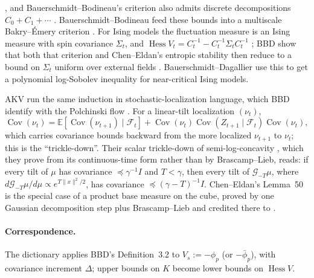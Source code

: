 \documentclass[11pt]{article}
\newcommand{\E}{\mathbb{E}}
\DeclareMathOperator{\Cov}{Cov}
\newcommand{\norm}[1]{\lVert #1\rVert}
\newcommand{\sloc}[2]{\cite[#2]{#1}}
\begin{document}
\sloc{BauerschmidtBodineauDagallier2023-PolchinskiIntroduction}{Lemma~3.11, (3.56)},
and Bauerschmidt--Bodineau's criterion also admits discrete decompositions
$C_0+C_1+\cdots$
\sloc{BauerschmidtBodineau2019-SineGordonMultiscaleBakryEmery}{Thm.~2.6}.
Bauerschmidt--Bodineau feed these bounds into a multiscale Bakry--\'Emery
criterion \sloc{BauerschmidtBodineau2019-SineGordonMultiscaleBakryEmery}{Thms.~1.2 and~2.5}.
For Ising models the fluctuation measure is an Ising measure with
spin covariance $\Sigma_t$, and
$\operatorname{Hess}V_t=C_t^{-1}-C_t^{-1}\Sigma_tC_t^{-1}$
\sloc{BauerschmidtDagallier2022-NearCriticalIsingLSI}{(1.23)}; BBD show that
both that criterion and Chen--Eldan's entropic stability then reduce to a
bound on $\Sigma_t$ uniform over external fields
\sloc{BauerschmidtBodineauDagallier2023-PolchinskiIntroduction}{Thm.~6.12, Ex.~6.15}.
Bauerschmidt--Dagallier use this to get a polynomial log-Sobolev inequality
for near-critical Ising models.

AKV run the same induction in stochastic-localization language, which BBD
identify with the Polchinski flow
\sloc{BauerschmidtBodineauDagallier2023-PolchinskiIntroduction}{\S4.5}. For a
linear-tilt localization $(\nu_t)$,
\sloc{AnariKoehlerVuong2024-TrickleDownLocalizationSchemes}{eq.~(8), p.~32}
\[
 \Cov(\nu_t)=\E[\Cov(\nu_{t+1})\mid\mathcal F_t]
 +\Cov(\nu_t)\Cov(Z_{t+1}\mid\mathcal F_t)\Cov(\nu_t),
\]
which carries covariance bounds backward from the more localized
$\nu_{t+1}$ to $\nu_t$; this is the ``trickle-down''. Their scalar
trickle-down of semi-log-concavity
\sloc{AnariKoehlerVuong2024-TrickleDownLocalizationSchemes}{Thm.~102, p.~76},
which they prove from its continuous-time form
\sloc{AnariKoehlerVuong2024-TrickleDownLocalizationSchemes}{(10)} rather than
by Brascamp--Lieb,
reads: if every tilt of $\mu$ has covariance $\preceq\gamma^{-1}I$ and
$T<\gamma$, then every tilt of $\mathcal G_{-T}\mu$, where
$d\mathcal G_{-T}\mu/d\mu\propto e^{T\norm x^2/2}$, has covariance
$\preceq(\gamma-T)^{-1}I$. Chen--Eldan's Lemma~50
\cite{ChenEldan2022-LocalizationSchemes} is the special case of a product
base measure on the cube, proved by one Gaussian decomposition step plus
Brascamp--Lieb and credited there to
\cite{BauerschmidtBodineau2017-SimpleProofLSIHighTemp}.

\paragraph{Correspondence.}
The dictionary applies BBD's Definition~3.2 to $V_s:=-\phi_p$ (or
$-\bar\phi_p$), with covariance increment $\Delta$; upper bounds on $K$
become lower bounds on $\operatorname{Hess}V$.
\end{document}
